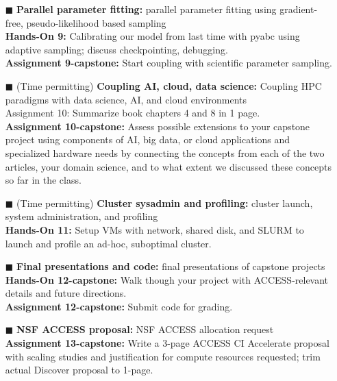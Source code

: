 \documentclass{article}
\begin{document}
\begin{tcbposter}
{\begin{multicols}{2}
\begin{itemize}
        implemented\supercite{cilfone_2015}.%
      \item[\textcolor{green!50!black}{$\blacksquare$}] \textbf{
          Parallel parameter fitting:} parallel parameter fitting
        using gradient-free, pseudo-likelihood based sampling\\
        \textbf{Hands-On 9:} Calibrating our model from last time with
        pyabc using adaptive sampling; discuss
        checkpointing, debugging.\\
        \textbf{Assignment 9-capstone:} Start coupling with scientific
        parameter sampling.%
      \item[\textcolor{green!50!black}{$\blacksquare$}] (Time
        permitting) \textbf{Coupling AI, cloud, data science:}
        Coupling HPC
        paradigms with data science, AI, and cloud environments\\
        Assignment 10: Summarize book\supercite{zbakh_2024} chapters 4
        and 8 in 1 page.\\
        \textbf{Assignment 10-capstone:} Assess possible extensions to
        your capstone project using components of AI, big data, or
        cloud applications and specialized hardware needs by
        connecting the concepts from each of the two articles, your
        domain science, and to what extent we discussed these concepts
        so far in the class.%
      \item[\textcolor{black!60}{$\blacksquare$}] (Time permitting)
        \textbf{Cluster sysadmin and profiling:} cluster launch,
        system
        administration, and profiling\\
        \textbf{Hands-On 11:} Setup VMs with network, shared disk, and
        SLURM to launch and profile an ad-hoc, suboptimal cluster.%
      \item[\textcolor{red!80!black}{$\blacksquare$}] \textbf{Final
          presentations and code:} final presentations of capstone
        projects\\
        \textbf{Hands-On 12-capstone:} Walk though your project with
        ACCESS-relevant details and future directions.\\
        \textbf{Assignment 12-capstone:} Submit code for grading.%
      \item[\textcolor{red!80!black}{$\blacksquare$}] \textbf{NSF
          ACCESS proposal:} NSF ACCESS allocation request\\
        \textbf{Assignment 13-capstone:} Write a 3-page ACCESS CI
        Accelerate proposal with scaling studies and justification for
        compute resources requested; trim actual Discover proposal to
        1-page.%
      \end{itemize}
    \end{multicols}
  }


\end{tcbposter}
\end{document}
